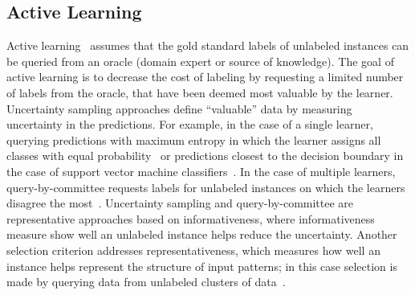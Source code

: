 \subsection{Active Learning}
Active learning~\cite{zhou2017brief} assumes that the gold standard labels of unlabeled instances can be queried from an oracle (domain expert or source of knowledge). 
The goal of active learning is to decrease the cost of labeling by requesting a limited number of labels from the oracle, that have been deemed most valuable by the learner.
Uncertainty sampling approaches define ``valuable'' data by measuring uncertainty in the predictions.
For example, in the case of a single learner, querying predictions with maximum entropy in which the learner assigns all classes with equal probability~\cite{lewis1994heterogeneous} or predictions closest to the decision boundary in the case of support vector machine classifiers~\cite{campbell2000query}.
In the case of multiple learners, query-by-committee requests labels for unlabeled instances on which the learners disagree the most~\cite{seung1992query}.
Uncertainty sampling and query-by-committee are representative approaches based on informativeness, where informativeness measure show well an unlabeled instance helps reduce the uncertainty. 
Another selection criterion addresses representativeness, which measures how well an instance helps represent the structure of input patterns; in this case selection is made by querying data from unlabeled clusters of data~\cite{nguyen2004active,dasgupta2008hierarchical}.

